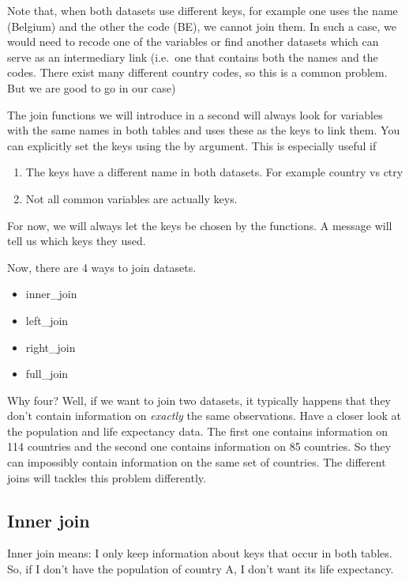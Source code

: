 \documentclass[]{tufte-book}
\providecommand{\tightlist}{%
  \setlength{\itemsep}{0pt}\setlength{\parskip}{0pt}}
\begin{document}
Note that, when both datasets use different keys, for example one uses the name (Belgium) and the other the code (BE), we cannot join them. In such a case, we would need to recode one of the variables or find another datasets which can serve as an intermediary link (i.e.~one that contains both the names and the codes. There exist many different country codes, so this is a common problem. But we are good to go in our case)

The join functions we will introduce in a second will always look for variables with the same names in both tables and uses these as the keys to link them. You can explicitly set the keys using the by argument. This is especially useful if

\begin{enumerate}
\def\labelenumi{\alph{enumi})}
\tightlist
\item
  The keys have a different name in both datasets. For example country vs ctry
\item
  Not all common variables are actually keys.
\end{enumerate}

For now, we will always let the keys be chosen by the functions. A message will tell us which keys they used.

Now, there are 4 ways to join datasets.

\begin{itemize}
\tightlist
\item
  inner\_join
\item
  left\_join
\item
  right\_join
\item
  full\_join
\end{itemize}

Why four? Well, if we want to join two datasets, it typically happens that they don't contain information on \emph{exactly} the same observations. Have a closer look at the population and life expectancy data. The first one contains information on 114 countries and the second one contains information on 85 countries. So they can impossibly contain information on the same set of countries. The different joins will tackles this problem differently.

\hypertarget{inner-join}{%
\subsection{Inner join}\label{inner-join}}

Inner join means: I only keep information about keys that occur in both tables. So, if I don't have the population of country A, I don't want its life expectancy.
\end{document}
